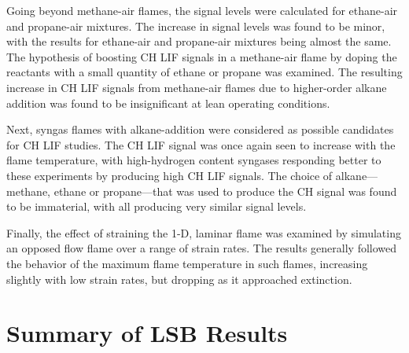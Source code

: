 Going beyond methane-air flames, the signal levels were calculated for ethane-air and propane-air mixtures.
The increase in signal levels was found to be minor, with the results for ethane-air and propane-air mixtures being almost the same.
The hypothesis of boosting CH LIF signals in a methane-air flame by doping the reactants with a small quantity of ethane or propane was examined.
The resulting increase in CH LIF signals from methane-air flames due to higher-order alkane addition was found to be insignificant at lean operating conditions.

Next, syngas flames with alkane-addition were considered as possible candidates for CH LIF studies.
The CH LIF signal was once again seen to increase with the flame temperature, with high-hydrogen content syngases responding better to these experiments by producing high CH LIF signals.
The choice of alkane---methane, ethane or propane---that was used to produce the CH signal was found to be immaterial, with all producing very similar signal levels.

Finally, the effect of straining the 1-D, laminar flame was examined by simulating an opposed flow flame over a range of strain rates.
The results generally followed the behavior of the maximum flame temperature in such flames, increasing slightly with low strain rates, but dropping as it approached extinction.

\section{Summary of LSB Results}

